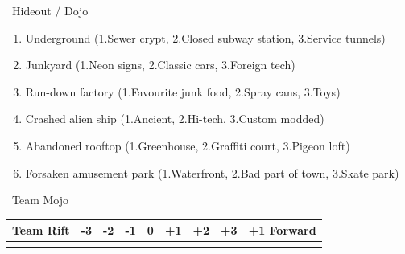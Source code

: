 \Large{}~Hideout / Dojo
\normalfont\large
\vspace{-6pt}
\begin{enumerate}
    \setlength\itemsep{-0.5em}
    \item Underground (1.Sewer crypt, 2.Closed subway station, 3.Service tunnels)
    \item Junkyard (1.Neon signs, 2.Classic cars, 3.Foreign tech)
    \item Run-down factory (1.Favourite junk food, 2.Spray cans, 3.Toys)
    \item Crashed alien ship (1.Ancient, 2.Hi-tech, 3.Custom modded)
    \item Abandoned rooftop (1.Greenhouse, 2.Graffiti court, 3.Pigeon loft)
    \item Forsaken amusement park (1.Waterfront, 2.Bad part of town, 3.Skate park)
\end{enumerate}

\vspace{0.5cm}

\Large{}~Team Mojo \hspace{0.5cm}
\normalfont\large
\begin{tabular}{|r|c|c|c|c|c|c|c|c|}
    \hline
    Team Rift & -3 & -2 & -1 & 0 & +1 & +2 & +3 & +1 Forward \\
    \hline
    &&&&&&&&\\
    \hline
\end{tabular}
\hspace{0.5cm}\Large\faPizzaSlice